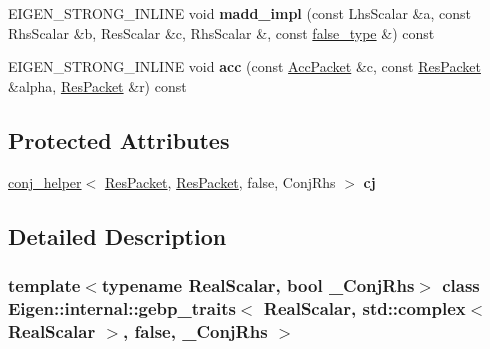 \begin{DoxyCompactItemize}
E\+I\+G\+E\+N\+\_\+\+S\+T\+R\+O\+N\+G\+\_\+\+I\+N\+L\+I\+NE void {\bfseries madd\+\_\+impl} (const Lhs\+Scalar \&a, const Rhs\+Scalar \&b, Res\+Scalar \&c, Rhs\+Scalar \&, const \hyperlink{struct_eigen_1_1internal_1_1false__type}{false\+\_\+type} \&) const
\item 
\mbox{\label{class_eigen_1_1internal_1_1gebp__traits_3_01_real_scalar_00_01std_1_1complex_3_01_real_scalar_01f99740ceef5f07e0f3738974eb65d89c_ac7066a8472bba3b2fa8a6d7851aa84d1}} 
E\+I\+G\+E\+N\+\_\+\+S\+T\+R\+O\+N\+G\+\_\+\+I\+N\+L\+I\+NE void {\bfseries acc} (const \hyperlink{class_eigen_1_1internal_1_1_tensor_lazy_evaluator_writable}{Acc\+Packet} \&c, const \hyperlink{class_eigen_1_1internal_1_1_tensor_lazy_evaluator_writable}{Res\+Packet} \&alpha, \hyperlink{class_eigen_1_1internal_1_1_tensor_lazy_evaluator_writable}{Res\+Packet} \&r) const
\end{DoxyCompactItemize}
\subsection*{Protected Attributes}
\begin{DoxyCompactItemize}
\item 
\mbox{\label{class_eigen_1_1internal_1_1gebp__traits_3_01_real_scalar_00_01std_1_1complex_3_01_real_scalar_01f99740ceef5f07e0f3738974eb65d89c_aa3356d00b43f4e7ea1899b8e74804502}} 
\hyperlink{struct_eigen_1_1internal_1_1conj__helper}{conj\+\_\+helper}$<$ \hyperlink{class_eigen_1_1internal_1_1_tensor_lazy_evaluator_writable}{Res\+Packet}, \hyperlink{class_eigen_1_1internal_1_1_tensor_lazy_evaluator_writable}{Res\+Packet}, false, Conj\+Rhs $>$ {\bfseries cj}
\end{DoxyCompactItemize}


\subsection{Detailed Description}
\subsubsection*{template$<$typename Real\+Scalar, bool \+\_\+\+Conj\+Rhs$>$\newline
class Eigen\+::internal\+::gebp\+\_\+traits$<$ Real\+Scalar, std\+::complex$<$ Real\+Scalar $>$, false, \+\_\+\+Conj\+Rhs $>$}



